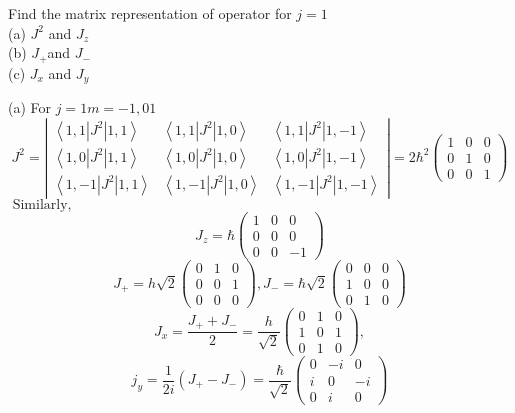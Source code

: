 \begin{exercise}
 Find the matrix representation of operator for $j=1$\\
	(a) $J^{2}$ and $J_{z}$\\
	(b) $J_{+}$and $J_{-}$\\
	(c) $J_{x}$ and $J_{y}$
\end{exercise}
\begin{answer}
 (a) For $j=1 m=-1,01$
$$
J^{2}=\left|\begin{array}{ccc}
\left\langle 1,1\left|J^{2}\right| 1,1\right\rangle & \left\langle 1,1\left|J^{2}\right| 1,0\right\rangle & \left\langle 1,1\left|J^{2}\right| 1,-1\right\rangle \\
\left\langle 1,0\left|J^{2}\right| 1,1\right\rangle & \left\langle 1,0\left|J^{2}\right| 1,0\right\rangle & \left\langle 1,0\left|J^{2}\right| 1,-1\right\rangle \\
\left\langle 1,-1\left|J^{2}\right| 1,1\right\rangle & \left\langle 1,-1\left|J^{2}\right| 1,0\right\rangle & \left\langle 1,-1\left|J^{2}\right| 1,-1\right\rangle
\end{array}\right|=2 \hbar^{2}\left(\begin{array}{ccc}
1 & 0 & 0 \\
0 & 1 & 0 \\
0 & 0 & 1
\end{array}\right)
$$
$\text { Similarly, }$ $$J_{z}=\hbar\left(\begin{array}{ccc}
	1 & 0 & 0 \\
	0 & 0 & 0 \\
	0 & 0 & -1
\end{array}\right)$$
$$J_{+}=h \sqrt{2}\left(\begin{array}{lll}
	0 & 1 & 0 \\
	0 & 0 & 1 \\
	0 & 0 & 0
\end{array}\right), J_{-}=\hbar \sqrt{2}\left(\begin{array}{lll}
	0 & 0 & 0 \\
	1 & 0 & 0 \\
	0 & 1 & 0
\end{array}\right)$$
$$J_{x}=\frac{J_{+}+J_{-}}{2}=\frac{h}{\sqrt{2}}\left(\begin{array}{lll}
	0 & 1 & 0 \\
	1 & 0 & 1 \\
	0 & 1 & 0
\end{array}\right),$$
$$ j_{y}=\frac{1}{2 i}\left(J_{+}-J_{-}\right)=\frac{\hbar}{\sqrt{2}}\left(\begin{array}{ccc}
	0 & -i & 0 \\
	i & 0 & -i \\
	0 & i & 0
\end{array}\right)$$	
\end{answer}
